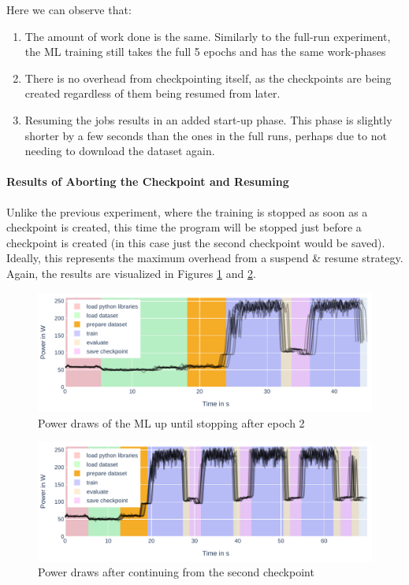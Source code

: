 Here we can observe that:

\begin{enumerate}
    \item The amount of work done is the same. 
    Similarly to the full-run experiment, the ML training still takes the full 5 epochs and has the same work-phases
    \item There is no overhead from checkpointing itself, as the checkpoints are being created regardless of them being resumed from later.
    \item Resuming the jobs results in an added start-up phase. This phase is slightly shorter by a few seconds than the ones in the full runs, perhaps due to not needing to download the dataset again.
\end{enumerate}

\newpage
\paragraph{Results of Aborting the Checkpoint and Resuming}

Unlike the previous experiment, where the training is stopped as soon as a checkpoint is created, this time the program will be stopped just before a checkpoint is created (in this case just the second checkpoint would be saved). 
Ideally, this represents the maximum overhead from a suspend \& resume strategy. 
Again, the results are visualized in Figures \ref{fig:plot_partial_abort_stacked} and \ref{fig:plot_partial_abort_continue_stacked}. 

\begin{figure}[H]
    \includegraphics[width=\linewidth]{power-measurements/stacked_plots/roberta_stop_without_saving.pdf}
    \caption{Power draws of the ML up until stopping after epoch 2}
    \label{fig:plot_partial_abort_stacked}
\end{figure}

\begin{figure}[H]
    \includegraphics[width=\linewidth]{power-measurements/stacked_plots/roberta_continue_after_not_saving.pdf}
    \caption{Power draws after continuing from the second checkpoint}
    \label{fig:plot_partial_abort_continue_stacked}
\end{figure}

